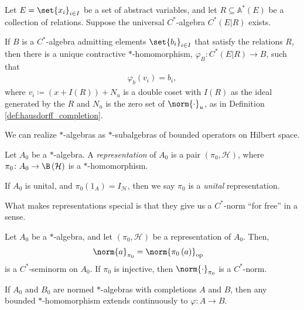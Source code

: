 \begin{proposition}\label{prop:universal_property_universal_cstar_algebra}
  Let $E = \set{x_i}_{i\in I}$ be a set of abstract variables, and let $R\subseteq \mathbb{A}^{\ast}\left( E \right)$ be a collection of relations. Suppose the universal $C^{\ast}$-algebra $C^{\ast}\left( E|R \right)$ exists.\newline

  If $B$ is a $C^{\ast}$-algebra admitting elements $\set{b_i}_{i\in I}$ that satisfy the relations $R$, then there is a unique contractive $\ast$-homomorphism, $\varphi_B\colon C^{\ast}\left( E|R \right) \rightarrow B$, such that
  \begin{align*}
    \varphi_b\left( v_i \right) = b_i,
  \end{align*}
  where $v_i \coloneq \left( x + I(R) \right) + N_u$ is a double coset with $I(R)$ as the ideal generated by the $R$ and $N_u$ is the zero set of $\norm{\cdot}_u$, as in Definition \ref{def:hausdorff_completion}.
\end{proposition}
We can realize $\ast$-algebras as $\ast$-subalgebras of bounded operators on Hilbert space.
\begin{definition}\label{def:unital_representation}
  Let $A_0$ be a $\ast$-algebra. A \textit{representation} of $A_0$ is a pair $\left( \pi_0,\mathcal{H} \right)$, where $\pi_0\colon A_0\rightarrow \B\left( \mathcal{H} \right)$ is a $\ast$-homomorphism.\newline

  If $A_0$ is unital, and $\pi_0\left( 1_A \right) = I_{\mathcal{H}}$, then we say $\pi_0$ is a \textit{unital} representation.
\end{definition}
What makes representations special is that they give us a $C^{\ast}$-norm ``for free'' in a sense.
\begin{lemma}
  Let $A_0$ be a $\ast$-algebra, and let $\left( \pi_0,\mathcal{H} \right)$ be a representation of $A_0$. Then,
  \begin{align*}
    \norm{a}_{\pi_0} &= \norm{\pi_0\left( a \right)}_{\op}
  \end{align*}
  is a $C^{\ast}$-seminorm on $A_0$. If $\pi_0$ is injective, then $\norm{\cdot}_{\pi_0}$ is a $C^{\ast}$-norm.
\end{lemma}
\begin{lemma}
  If $A_0$ and $B_0$ are normed $\ast$-algebras with completions $A$ and $B$, then any bounded $\ast$-homomorphism extends continuously to $\varphi\colon A\rightarrow B$.
\end{lemma}
